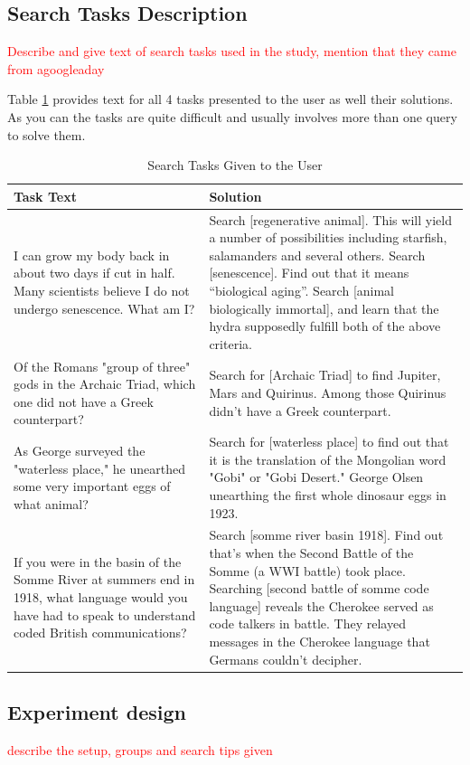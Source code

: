 \documentclass{sig-alternate}
\newcommand\todo[1]{\textcolor{red}{#1}}
\begin{document}
\subsection{Search Tasks Description}
\todo{Describe and give text of search tasks used in the study, mention that they came from agoogleaday}

Table \ref{table:tasks} provides text for all 4 tasks presented to the user as well their solutions. As you can the tasks are quite difficult and usually involves more than one query to solve them.

\begin{table}
\centering
\caption{Search Tasks Given to the User}
\label{table:tasks}
\begin{tabular}{|p{8cm}|p{9cm}|} \hline
Task Text & Solution\\ \hline
I can grow my body back in about two days if cut in half. Many scientists believe I do not undergo senescence. What am I? & Search [regenerative animal]. This will yield a number of possibilities including starfish, salamanders and several others. Search [senescence]. Find out that it means ``biological aging''. Search [animal biologically immortal], and learn that the hydra supposedly fulfill both of the above criteria. \\ \hline
Of the Romans "group of three" gods in the Archaic Triad, which one did not have a Greek counterpart? & Search for [Archaic Triad] to find Jupiter, Mars and Quirinus. Among those Quirinus didn't have a Greek counterpart.\\ \hline
As George surveyed the "waterless place," he unearthed some very important eggs of what animal? & Search for [waterless place] to find out that it is the translation of the Mongolian word "Gobi" or "Gobi Desert." George Olsen unearthing the first whole dinosaur eggs in 1923. \\ \hline
If you were in the basin of the Somme River at summers end in 1918, what language would you have had to speak to understand coded British communications? & Search [somme river basin 1918]. Find out that's when the Second Battle of the Somme (a WWI battle) took place. Searching [second battle of somme code language] reveals the Cherokee served as code talkers in battle. They relayed messages in the Cherokee language that Germans couldn't decipher. \\ \hline
\hline\end{tabular}
\end{table}

\subsection{Experiment design}
\todo{describe the setup, groups and search tips given}
\end{document}
